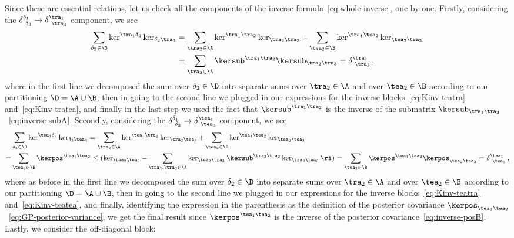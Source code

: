Since these are essential relations, let us check all the components of the inverse formula~\eqref{eq:whole-inverse}, one by one.
Firstly, considering the $\delta^{\delta_1}_{\ \delta_3} \to \delta^{\tra_1}_{\ \tra_3}$ component, we see
\begin{align}
\sum_{\delta_2\in\D}\ker^{\tra_1\delta_2}\ker_{\delta_2 \tra_3}&=\sum_{\tra_2\in\A}\ker^{\tra_1\tra_2}\ker_{\tra_2 \tra_3}+\sum_{\tea_2\in\B}\ker^{\tra_1\tea_2}\ker_{\tea_2 \tra_3}\, \notag \\
&=\sum_{\tra_2\in\A}\kersub^{\tra_1\tra_2}\kersub_{\tra_2 \tra_3}=\delta^{\tra_1}_{\ \tra_3}\, ,
\end{align}
where in the first line we decomposed the sum over $\delta_2 \in \D$ into separate sums over $\tra_2 \in \A$ and over $\tea_2 \in \B$ according to our partitioning $\D = \A \cup \B$, then in going to the second line we plugged in our expressions for the inverse blocks~\eqref{eq:Kinv-tratra} and~\eqref{eq:Kinv-tratea}, 
and finally in the last step we used the fact that $\kersub^{\tra_1\tra_2}$ is the inverse of the submatrix $\kersub_{\tra_1\tra_2}$~\eqref{eq:inverse-subA}.
Secondly, considering the $\delta^{\delta_1}_{\ \delta_3} \to \delta^{\tea_1}_{\ \tea_3}$ component, we see
\begin{align}
&\sum_{\delta_2\in\D}\ker^{\tea_1\delta_2}\ker_{\delta_2 \tea_3}=\sum_{\tra_2\in\A}\ker^{\tea_1\tra_2}\ker_{\tra_2 \tea_3}+\sum_{\tea_2\in\B}\ker^{\tea_1\tea_2}\ker_{\tea_2 \tea_3}\, \\
=&\sum_{\tea_2\in\B}\kerpos^{\tea_1\tea_2}\le(\ker_{\tea_2 \tea_3}-\sum_{\tra_3,\tra_2\in\A} \ker_{\tea_2\tra_3}\kersub^{\tra_3\tra_2}\ker_{\tra_2\tea_3}\ri)=\sum_{\tea_2\in\B}\kerpos^{\tea_1\tea_2}\kerpos_{\tea_2\tea_3}=\delta^{\tea_1}_{\ \tea_3}\, ,\notag
\end{align}
where as  before in the first line we decomposed the sum over $\delta_2 \in \D$ into separate sums over $\tra_2 \in \A$ and over $\tea_2 \in \B$ according to our partitioning $\D = \A \cup \B$, then in going to the second line we plugged in our expressions for the inverse blocks~\eqref{eq:Kinv-teatra} and~\eqref{eq:Kinv-teatea}, and finally, identifying the expression in the parenthesis as the definition of the posterior covariance $\kerpos_{\tea_1\tea_2}$~\eqref{eq:GP-posterior-variance}, we get the final result since $\kerpos^{\tea_1\tea_2}$ is the inverse of the posterior covariance~\eqref{eq:inverse-posB}.
Lastly, we consider the off-diagonal block:
